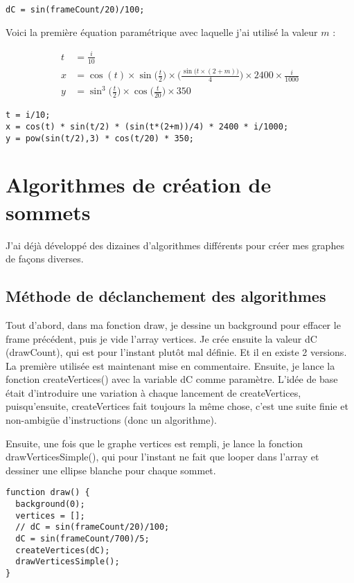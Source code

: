 \begin{lstlisting}
dC = sin(frameCount/20)/100;
\end{lstlisting}

Voici la première équation paramétrique avec laquelle j'ai utilisé la valeur $m$ :

\begin{align*}
    t &= \frac{i}{10}\\
    x &= \cos(t) \times \sin\bigg(\frac{t}{2}\bigg) \times \bigg(\frac{\sin\big(t\times(2+m)\big)}{4}\bigg) \times 2400 \times \frac{i}{1000}\\
    y &= \sin^3\bigg(\frac{t}{2}\bigg) \times \cos\bigg(\frac{t}{20}\bigg) \times 350
\end{align*}

\begin{lstlisting}
t = i/10;
x = cos(t) * sin(t/2) * (sin(t*(2+m))/4) * 2400 * i/1000;
y = pow(sin(t/2),3) * cos(t/20) * 350;
\end{lstlisting}

\section{Algorithmes de création de sommets}

J'ai déjà développé des dizaines d'algorithmes différents pour créer mes graphes de façons diverses.

\subsection{Méthode de déclanchement des algorithmes}

Tout d'abord, dans ma fonction draw, je dessine un background pour effacer le frame précédent, puis je vide l'array vertices. Je crée ensuite la valeur dC (drawCount), qui est pour l'instant plutôt mal définie. Et il en existe 2 versions. La première utilisée est maintenant mise en commentaire. Ensuite, je lance la fonction createVertices() avec la variable dC comme paramètre. L'idée de base était d'introduire une variation à chaque lancement de createVertices, puisqu'ensuite, createVertices fait toujours la même chose, c'est une suite finie et non-ambigüe d'instructions (donc un algorithme).

Ensuite, une fois que le graphe vertices est rempli, je lance la fonction drawVerticesSimple(), qui pour l'instant ne fait que looper dans l'array et dessiner une ellipse blanche pour chaque sommet.

\begin{lstlisting}
function draw() {
  background(0);
  vertices = [];
  // dC = sin(frameCount/20)/100;
  dC = sin(frameCount/700)/5;
  createVertices(dC);
  drawVerticesSimple();
}
\end{lstlisting}

